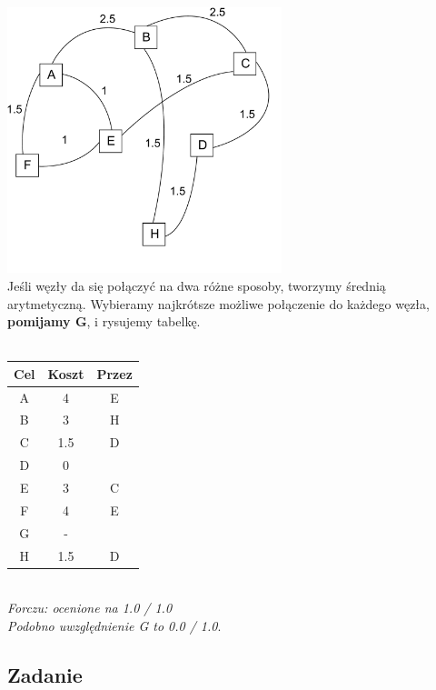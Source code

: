 				\includegraphics[width=8.0cm]{./images/zadanie06.pdf}\\
			Jeśli węzły da się połączyć na dwa różne sposoby, tworzymy średnią arytmetyczną. Wybieramy najkrótsze możliwe połączenie do każdego węzła, \textbf{pomijamy G}, i rysujemy tabelkę.\\\\ 
			\begin{tabular}{c|c|c}
				Cel & Koszt & Przez \\ \hline
				A   & 4     & E     \\
				B   & 3     & H     \\
				C   & 1.5   & D     \\
				D   & 0     &       \\
				E   & 3     & C     \\
				F   & 4     & E     \\
				G   & -     &       \\
				H   & 1.5   & D     
			\end{tabular}\\
			\small{ \emph{Forczu: ocenione na 1.0 / 1.0\\
					Podobno uwzględnienie G to 0.0 / 1.0}}.
	\subsection{Zadanie}
